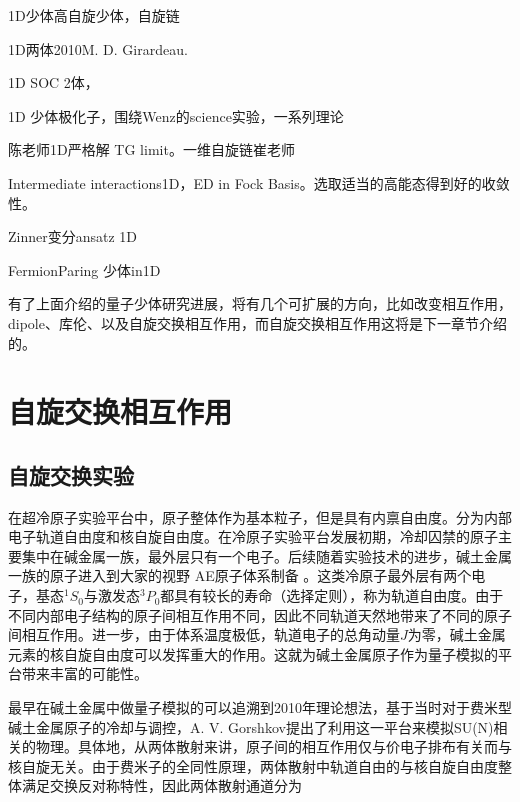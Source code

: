 1D少体高自旋少体，自旋链

1D两体2010M. D. Girardeau. 

1D SOC 2体，

1D 少体极化子，围绕Wenz的science实验，一系列理论

陈老师1D严格解 TG limit。一维自旋链崔老师

Intermediate interactions1D，ED in Fock Basis。选取适当的高能态得到好的收敛性。

Zinner变分ansatz 1D

FermionParing 少体in1D



有了上面介绍的量子少体研究进展，将有几个可扩展的方向，比如改变相互作用，dipole、库伦、以及自旋交换相互作用，而自旋交换相互作用这将是下一章节介绍的。

\section{自旋交换相互作用}\label{sec:spin-exchange}

\subsection{自旋交换实验}
在超冷原子实验平台中，原子整体作为基本粒子，但是具有内禀自由度。分为内部电子轨道自由度和核自旋自由度。在冷原子实验平台发展初期，冷却囚禁的原子主要集中在碱金属一族，最外层只有一个电子。后续随着实验技术的进步，碱土金属一族的原子进入到大家的视野{\color{red} AE原子体系制备 }。这类冷原子最外层有两个电子，基态${}^1S_0$与激发态${}^3P_0$都具有较长的寿命（选择定则），称为轨道自由度。由于不同内部电子结构的原子间相互作用不同，因此不同轨道天然地带来了不同的原子间相互作用。进一步，由于体系温度极低，轨道电子的总角动量$J$为零，碱土金属元素的核自旋自由度可以发挥重大的作用。这就为碱土金属原子作为量子模拟的平台带来丰富的可能性。

最早在碱土金属中做量子模拟的可以追溯到2010年理论想法，基于当时对于费米型碱土金属原子的冷却与调控，A. V. Gorshkov提出了利用这一平台来模拟SU(N)相关的物理。具体地，从两体散射来讲，原子间的相互作用仅与价电子排布有关而与核自旋无关。由于费米子的全同性原理，两体散射中轨道自由的与核自旋自由度整体满足交换反对称特性，因此两体散射通道分为

